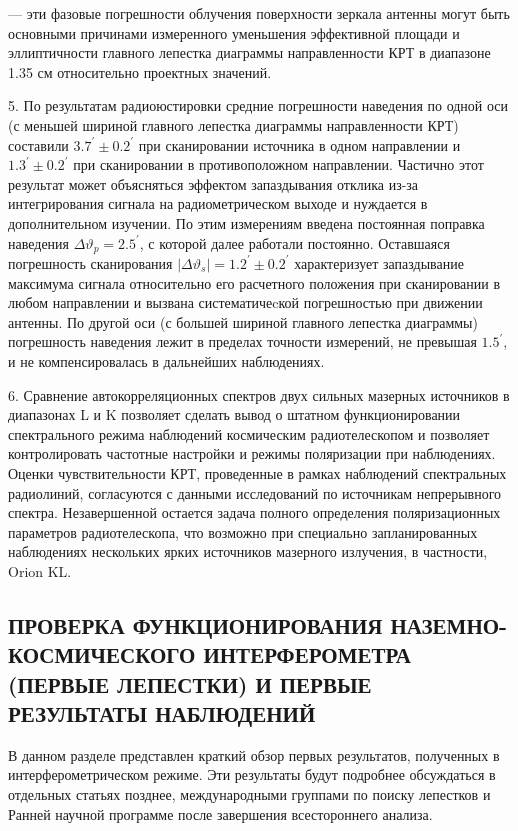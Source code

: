--- эти фазовые погрешности облучения поверхности зеркала антенны
могут быть основными причинами измеренного уменьшения эффективной
площади и эллиптичности главного лепестка диаграммы направленности
КРТ в диапазоне 1.35 см  относительно проектных значений.

5. По результатам радиоюстировки средние погрешности наведения по
одной оси (с меньшей шириной главного лепестка диаграммы направленности
КРТ) составили $3.7^\prime \pm 0.2^\prime$  при
сканировании источника в одном направлении и $1.3^\prime \pm 0.2^\prime$  при сканировании в
противоположном направлении.
Частично этот результат может объясняться эффектом запаздывания отклика
из-за интегрирования
сигнала на радиометрическом выходе и нуждается в дополнительном изучении.
По этим измерениям введена постоянная поправка наведения
$\Delta \vartheta_p = 2.5^\prime$,
с которой далее работали постоянно. Оставшаяся погрешность сканирования
$\vert \Delta \vartheta_s \vert = 1.2^\prime \pm 0.2^\prime$   характеризует
запаздывание максимума сигнала относительно его расчетного
положения при сканировании в любом направлении и вызвана систематичеcкой
погрешностью при движении антенны.
По другой оси (с большей шириной главного лепестка диаграммы) погрешность
наведения лежит в пределах точности измерений, не превышая $1.5^\prime$,
и не компенсировалась в дальнейших наблюдениях.

6. Сравнение автокорреляционных спектров двух сильных мазерных источников в
диапазонах L и K позволяет сделать вывод о штатном функционировании спектрального
режима наблюдений космическим радиотелескопом и позволяет контролировать
частотные настройки и режимы поляризации при наблюдениях. Оценки чувствительности
КРТ, проведенные в рамках наблюдений спектральных радиолиний, согласуются
с данными исследований по источникам непрерывного спектра.
Незавершенной остается задача полного определения поляризационных параметров
радиотелескопа, что возможно при специально запланированных наблюдениях нескольких
ярких источников мазерного излучения, в частности, Orion KL.


\subsection{ПРОВЕРКА ФУНКЦИОНИРОВАНИЯ НАЗЕМНО-КОСМИЧЕСКОГО
         ИНТЕРФЕРОМЕТРА (ПЕРВЫЕ ЛЕПЕСТКИ) И ПЕРВЫЕ РЕЗУЛЬТАТЫ
         НАБЛЮДЕНИЙ}

В данном разделе представлен краткий обзор первых результатов,
полученных в интерферометрическом режиме. Эти результаты
будут подробнее обсуждаться в отдельных статьях позднее,
международными группами по поиску лепестков и Ранней научной
программе после завершения всестороннего анализа.

